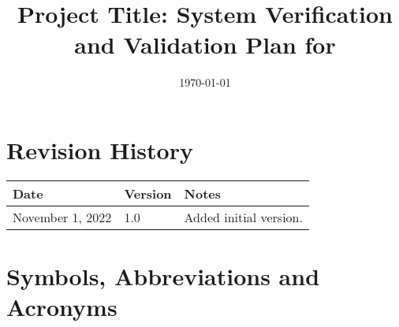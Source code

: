 \documentclass[12pt, titlepage]{article}
\begin{document}
\title{Project Title: System Verification and Validation Plan for \progname{}} 
\author{\authname}
\date{\today}
	
\maketitle


\section{Revision History}

\begin{tabularx}{\textwidth}{p{3cm}p{2cm}X}
\toprule {\bf Date} & {\bf Version} & {\bf Notes}\\
\midrule
November 1, 2022 & 1.0 & Added initial version.\\
\bottomrule
\end{tabularx}

\newpage

\tableofcontents

\listoftables

\newpage

\section{Symbols, Abbreviations and Acronyms}

\renewcommand{\arraystretch}{1.2}
\end{document}
